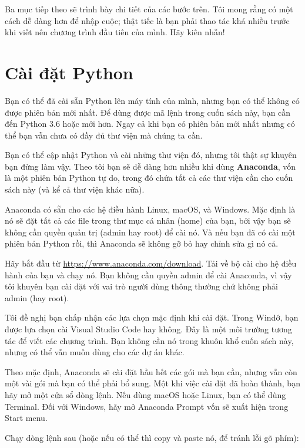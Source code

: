 \documentclass[12pt]{book}
\theoremstyle{exercise}
\begin{document}
Ba mục tiếp theo sẽ trình bày chi tiết của các bước trên. Tôi mong rằng có một cách dễ dàng hơn để nhập cuộc; thật tiếc là bạn phải thao tác khá nhiều trước khi viết nên chương trình đầu tiên của mình. Hãy kiên nhẫn!


\section{Cài đặt Python}

Bạn có thể đã cài sẵn Python lên máy tính của mình, nhưng bạn có thể không có được phiên bản mới nhất. Để dùng được mã lệnh trong cuốn sách này, bạn cần đến Python 3.6 hoặc mới hơn. Ngay cả khi bạn có phiên bản mới nhất nhưng có thể bạn vẫn chưa có đầy đủ thư viện mà chúng ta cần.


Bạn có thể cập nhật Python và cài những thư viện đó, nhưng tôi thật sự khuyên bạn đừng làm vậy. Theo tôi bạn sẽ dễ dàng hơn nhiều khi dùng {\bf Anaconda}, vốn là một phiên bản Python tự do, trong đó chứa tất cả các thư viện cần cho cuốn sách này (và kể cả thư viện khác nữa).


Anaconda có sẵn cho các hệ điều hành Linux, macOS, và Windows.  Mặc định là nó sẽ đặt tất cả các file trong thư mục cá nhân (home) của bạn, bởi vậy bạn sẽ không cần quyền quản trị (admin hay root) để cài nó. Và nếu bạn đã có cài một phiên bản Python rồi, thì Anaconda sẽ không gỡ bỏ hay chỉnh sửa gì nó cả.

Hãy bắt đầu từ \url{https://www.anaconda.com/download}.  Tải về bộ cài cho hệ điều hành của bạn và chạy nó. Bạn không cần quyền admin để cài Anaconda, vì vậy tôi khuyên bạn cài đặt với vai trò người dùng thông thường chứ không phải admin (hay root).

Tôi đề nghị bạn chấp nhận các lựa chọn mặc định khi cài đặt. Trong Windớ, bạn được lựa chọn cài Visual Studio Code hay không. Đây là một môi trường tương tác để viết các chương trình. Bạn không cần nó trong khuôn khổ cuốn sách này, nhưng có thể vẫn muốn dùng cho các dự án khác. 

Theo mặc định, Anaconda sẽ cài đặt hầu hết các gói mà bạn cần, nhưng vẫn còn một vài gói mà bạn có thể phải bổ sung. Một khi việc cài đặt đã hoàn thành, bạn hãy mở một cửa sổ dòng lệnh. Nếu dùng macOS hoặc Linux, bạn có thể dùng Terminal.  Đối với Windows, hãy mở Anaconda Prompt vốn sẽ xuất hiện trong Start menu.

Chạy dòng lệnh sau (hoặc nếu có thể thì copy và paste nó, để tránh lỗi gõ phím):
\end{document}
